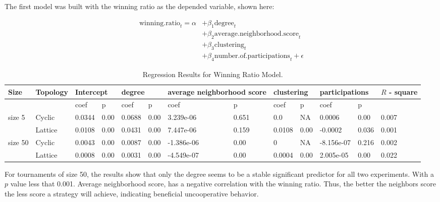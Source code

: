 The first model was built with the winning ratio as the depended variable,
shown here:

\begin{align}
	\mathrm{winning.ratio}_{t} = \alpha
	  & + \beta_{1}  \mathrm{degree}_{t}                              \\
	  & + \beta_{2}  \mathrm{average.neighborhood.score}_{t}          \\
	  & + \beta_{3}  \mathrm{clustering}_{t}                          \\
	  & + \beta_{4}  \mathrm{number.of.participations}_{t} + \epsilon
\end{align}

\begin{table}[!hbtp]
	\centering
	\begin{adjustbox}{width=1\textwidth}
		\small
		\begin{tabular}{@{}|l|l|l|l|l|l|l|l|l|l|l|l|l|@{}}
			\toprule
			Size & Topology & \multicolumn{2}{l|}{Intercept} & \multicolumn{2}{l|}{degree} & \multicolumn{2}{l|}{average neighborhood score} & \multicolumn{2}{l|}{clustering} & \multicolumn{2}{l|}{participations} & \(R\) - square \\ \midrule
			        &         & coef   & p    & coef   & p    & coef       & p     & coef   & p    & coef       & p     &       \\ \midrule
			size 5  & Cyclic  & 0.0344 & 0.00 & 0.0688 & 0.00 & 3.239e-06  & 0.651 & 0.0    & NA   & 0.0006     & 0.00  & 0.007 \\ \midrule
			        & Lattice & 0.0108 & 0.00 & 0.0431 & 0.00 & 7.447e-06  & 0.159 & 0.0108 & 0.00 & -0.0002    & 0.036 & 0.001 \\ \midrule
			size 50 & Cyclic  & 0.0043 & 0.00 & 0.0087 & 0.00 & -1.386e-06 & 0.00  & 0      & NA   & -8.156e-07 & 0.216 & 0.002 \\ \midrule
			        & Lattice & 0.0008 & 0.00 & 0.0031 & 0.00 & -4.549e-07 & 0.00  & 0.0004 & 0.00 & 2.005e-05  & 0.00  & 0.022 \\ \bottomrule
		\end{tabular}
	\end{adjustbox}
	\caption{Regression Results for Winning Ratio Model.}
	\label{regression-winning}
\end{table}

For tournaments of size 50, the results show that only the degree seems
to be a stable significant predictor for all two experiments. With a \(p\)
value less that 0.001. Average neighborhood score, has a negative correlation
with the winning ratio. Thus, the better the neighbors score the
less score a strategy will achieve, indicating beneficial uncooperative behavior.

